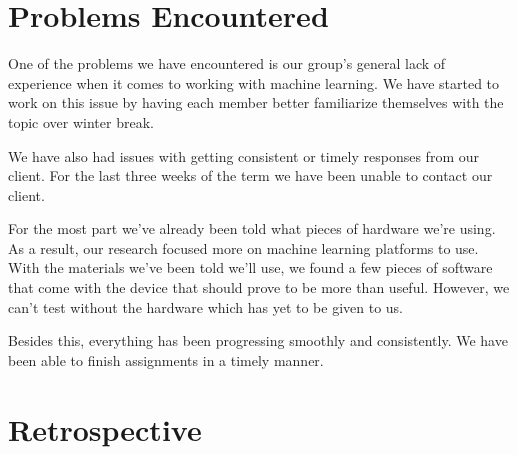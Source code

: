 \documentclass[onecolumn, draftclsnofoot,10pt, compsoc]{IEEEtran}
\begin{document}
\section{Problems Encountered}
One of the problems we have encountered is our group's general lack of experience when it comes to working with machine learning. We have started to work on this issue by having each member better familiarize themselves with the topic over winter break. 

We have also had issues with getting consistent or timely responses from our client. For the last three weeks of the term we have been unable to contact our client.

For the most part we've already been told what pieces of hardware we're using. As a result, our research focused more on machine learning platforms to use. With the materials we've been told we'll use, we found a few pieces of software that come with the device that should prove to be more than useful. However, we can't test without the hardware which has yet to be given to us.

Besides this, everything has been progressing smoothly and consistently. We have been able to finish assignments in a timely manner.


\section{Retrospective}
\def \wkOneP {
Week 1: we were each presented with many interesting projects, to individually choose from.
}
\def \wkOneD {
The autonomous R/C car project was assigned to each of us, and our team was formed.
}
\def \wkOneA {
We listed our top project choices and were assigned to this project. 
}

\def \wkTwoP {
Week 2: We met up as a group for the first time, introduced ourselves, and discussed the project for the first time. Additionally, we were able to get into contact with our client via video call.  
}
\def \wkTwoD {
Our client provided us with information about the hardware we are supposed to be using and suggested we research ultrasonic, LiDAR, and optical sensors.
We were also tasked with each creating our own individual problem statement for the project.
We were also tasked with making a requirements document.

}
\def \wkTwoA {
We started working on the requirements document and researching the hardware our client referred us to. 
}

\def \wkThreeP {
Week 3: Our group met to discuss our Team Standards document, Requirements document, and a rough timeline for our project.
}
\def \wkThreeD {
We were tasked with creating a group problem statement, as well as the first draft of our requirements document. We also decided to create a rough schedule for the rest of the term.
}
\def \wkThreeA {
We finished the first draft of our requirements document. We also finished our group problem statement. A rough draft of our project’s timeline was also produced. 
}
\end{document}
